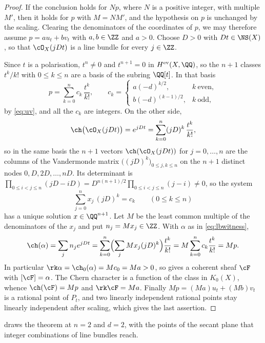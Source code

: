 \begin{proof}
If the conclusion holds for $Np$, where $N$ is a positive integer, with
multiple $M'$, then it holds for $p$ with $M=NM'$, and the hypothesis on $p$
is unchanged by the scaling. Clearing the denominators of the coordinates of
$p$, we may therefore assume $p=au_{t}+bv_{t}$ with $a,b\in\ZZ$ and $a>0$.
Choose $D>0$ with $Dt\in\NS(X)$, so that $\cO_{X}(jDt)$ is a line bundle for
every $j\in\ZZ$.

Since $t$ is a polarisation, $t^{n}\ne0$ and $t^{n+1}=0$ in
$H^{\mathrm{ev}}(X,\QQ)$, so the $n+1$ classes $t^{k}/k!$ with $0\le k\le n$
are a basis of the subring $\QQ[t]$. In that basis
\[
  p=\sum_{k=0}^{n}c_{k}\,\frac{t^{k}}{k!},\qquad
  c_{k}=\begin{cases}a(-d)^{k/2}, & k\ \text{even},\\[2pt]
                     b(-d)^{(k-1)/2}, & k\ \text{odd},\end{cases}
\]
by \eqref{eq:uv}, and all the $c_{k}$ are integers. On the other
side,
\[
  \ch\bigl(\cO_{X}(jDt)\bigr)=e^{jDt}=\sum_{k=0}^{n}(jD)^{k}\,\frac{t^{k}}{k!},
\]
so in the same basis the $n+1$ vectors $\ch(\cO_{X}(jDt))$ for $j=0,\dots,n$
are the columns of the Vandermonde matrix $\bigl((jD)^{k}\bigr)_{0\le j,k\le n}$
on the $n+1$ distinct nodes $0,D,2D,\dots,nD$. Its determinant is
$\prod_{0\le i<j\le n}(jD-iD)=D^{n(n+1)/2}\prod_{0\le i<j\le n}(j-i)\ne0$, so
the system
\[
  \sum_{j=0}^{n}x_{j}\,(jD)^{k}=c_{k}\qquad(0\le k\le n)
\]
has a unique solution $x\in\QQ^{n+1}$. Let $M$ be the least common multiple of
the denominators of the $x_{j}$ and put $n_{j}=Mx_{j}\in\ZZ$. With $\alpha$ as
in \eqref{eq:lbwitness},
\[
  \ch(\alpha)=\sum_{j}n_{j}e^{jDt}
  =\sum_{k=0}^{n}\Bigl(\sum_{j}Mx_{j}(jD)^{k}\Bigr)\frac{t^{k}}{k!}
  =M\sum_{k=0}^{n}c_{k}\frac{t^{k}}{k!}=Mp .
\]
In particular $\rk\alpha=\ch_{0}(\alpha)=Mc_{0}=Ma>0$, so 
gives a coherent sheaf $\cF$ with $[\cF]=\alpha$. The Chern character is a
function of the class in $K_{0}(X)$, whence $\ch(\cF)=Mp$ and $\rk\cF=Ma$.
Finally $Mp=(Ma)u_{t}+(Mb)v_{t}$ is a rational point of $P_{t}$, and two
linearly independent rational points stay linearly independent after scaling,
which gives the last assertion.
\end{proof}

 draws the theorem at $n=2$ and $d=2$, with the points of
the secant plane that integer combinations of line bundles reach.

